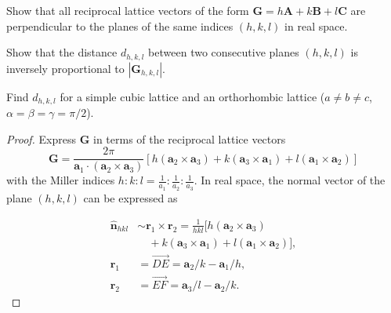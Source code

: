\begin{problem}\leavevmode
  \begin{enumext}
    \item Show that all reciprocal lattice vectors of the form
    $\bm G = h\bm A + k\bm B + l\bm C$ are perpendicular to the planes of the
    same indices $(h, k, l)$ in real space.
    \item Show that the distance $d_{h,k,l}$ between two consecutive planes
    $(h, k, l)$ is inversely proportional to $|\bm G_{h,k,l}|$.
    \item Find $d_{h,k,l}$ for a simple cubic lattice and an orthorhombic
    lattice ($a \neq b \neq c$, $\alpha = \beta = \gamma = \pi/2$).
  \end{enumext}
\end{problem}
\begin{solution}\leavevmode
  \begin{enumext}
    \item
    \begin{proof}
      Express $\bm G$ in terms of the reciprocal lattice vectors
      \[
        \bm G = \frac{2\pi}{\bm a_1 \cdot (\bm a_2 \times \bm a_3)}
           [h(\bm a_2 \times \bm a_3) + k(\bm a_3 \times \bm a_1)
          + l(\bm a_1 \times \bm a_2)]
      \]
      with the Miller indices $h:k:l = \frac1{a_1}:\frac1{a_2}:\frac1{a_3}$.
      In real space, the normal vector of the plane $(h, k, l)$ can be
      expressed as\\
      \begin{minipage}{.64\linewidth}
        \[
          \begin{aligned}
            \hat{\bm n}_{hkl} & \sim \bm r_1 \times \bm r_2
          = \frac1{hkl} [h(\bm a_2 \times \bm a_3) \\
        & \quad + k(\bm a_3 \times \bm a_1) +
                  l(\bm a_1 \times \bm a_2)],\\
          \bm r_1 & = \vec{DE} = \bm a_2/k - \bm a_1/h,\\
          \bm r_2 & = \vec{EF} = \bm a_3/l - \bm a_2/k.
          \end{aligned}
        \]
      \end{minipage}
      \hfill
      \begin{minipage}{.32\linewidth}
        \centering
\end{minipage}
\end{proof}
\end{enumext}
\end{solution}
